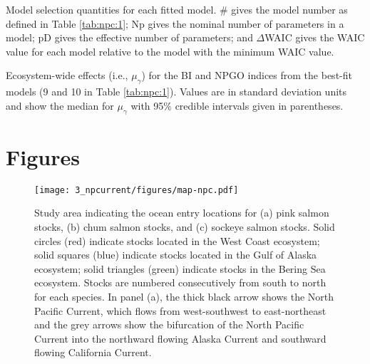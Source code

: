 \newpage
\begin{table}[!ht]
  \small \centering \libertineLF
  \caption[Model selection quantities for each fitted model]{Model selection
           quantities for each fitted model. \# gives the model number as
           defined in Table \ref{tab:npc:1}; Np gives the nominal number of
           parameters in a model; pD gives the effective number of parameters;
           and $\Delta$WAIC gives the WAIC value for each model relative to the
           model with the minimum WAIC value.}
  
  \label{tab:npc:2}
\end{table}


\newpage
\begin{table}[!ht]
  \small \centering \libertineLF
  \caption[Ecosystem-wide effects for the BI and NPGO indices from the
           best-fit models]{Ecosystem-wide effects (i.e., $\mu_{\gamma}$) for
           the BI and NPGO indices from the best-fit models (9 and 10 in Table
           \ref{tab:npc:1}). Values are in standard deviation units and show the
           median for $\mu_{\gamma}$ with 95\% credible intervals given in
           parentheses.}
  
  \label{tab:npc:3}
\end{table}




\section{Figures}

\begin{figure}[htbp]
  \centering \texttt{[image: 3\_npcurrent/figures/map-npc.pdf]}
  \caption[Study area indicating the ocean entry locations for salmon
           stocks by species]{Study area indicating the ocean entry locations
           for (a) pink salmon stocks, (b) chum salmon stocks, and (c) sockeye
           salmon stocks. Solid circles (red) indicate stocks located in the
           West Coast ecosystem; solid squares (blue) indicate stocks located in
           the Gulf of Alaska ecosystem; solid triangles (green) indicate stocks
           in the Bering Sea ecosystem. Stocks are numbered consecutively from
           south to north for each species. In panel (a), the thick black arrow
           shows the North Pacific Current, which flows from west-southwest to
           east-northeast and the grey arrows show the bifurcation of the North
           Pacific Current into the northward flowing Alaska Current and
           southward flowing California Current.}
  \label{fig:npc:1}
\end{figure}

